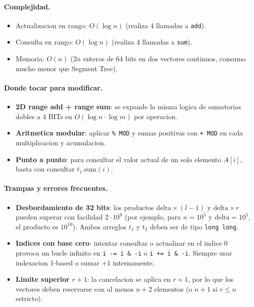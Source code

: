 \paragraph{Complejidad.}
\begin{itemize}\setlength\itemsep{0pt}
	\item Actualizacion en rango: $O(\log n)$ (realiza 4 llamadas a \texttt{add}).
	\item Consulta en rango: $O(\log n)$ (realiza 4 llamadas a \texttt{sum}).
	\item Memoria: $O(n)$ ($2n$ enteros de 64 bits en dos vectores continuos, consumo mucho menor que Segment Tree).
\end{itemize}

\paragraph{Donde tocar para modificar.}
\begin{itemize}\setlength\itemsep{0pt}
	\item \textbf{2D range add + range sum}: se expande la misma logica de sumatorias dobles a 4 BITs en $O(\log n \cdot \log m)$ por operacion.
	\item \textbf{Aritmetica modular}: aplicar \texttt{\% MOD} y sumas positivas con \texttt{+ MOD} en cada multiplicacion y acumulacion.
	\item \textbf{Punto a punto}: para consultar el valor actual de un solo elemento $A[i]$, basta con consultar $t_1.\text{sum}(i)$.
\end{itemize}

\paragraph{Trampas y errores frecuentes.}
\begin{itemize}\setlength\itemsep{0pt}
	\item \textbf{Desbordamiento de 32 bits}: los productos $\text{delta} \times (l - 1)$ y $\text{delta} \times r$ pueden superar con facilidad $2 \cdot 10^9$ (por ejemplo, para $n = 10^5$ y $\text{delta} = 10^5$, el producto es $10^{10}$). Ambos arreglos $t_1$ y $t_2$ deben ser de tipo \texttt{long long}.
	\item \textbf{Indices con base cero}: intentar consultar o actualizar en el indice 0 provoca un bucle infinito en \texttt{i -= i \& -i} o \texttt{i += i \& -i}. Siempre usar indexacion 1-based o sumar $+1$ internamente.
	\item \textbf{Limite superior $r + 1$}: la cancelacion se aplica en $r + 1$, por lo que los vectores deben reservarse con al menos $n + 2$ elementos (o $n + 1$ si $r \le n$ estricto).
\end{itemize}


